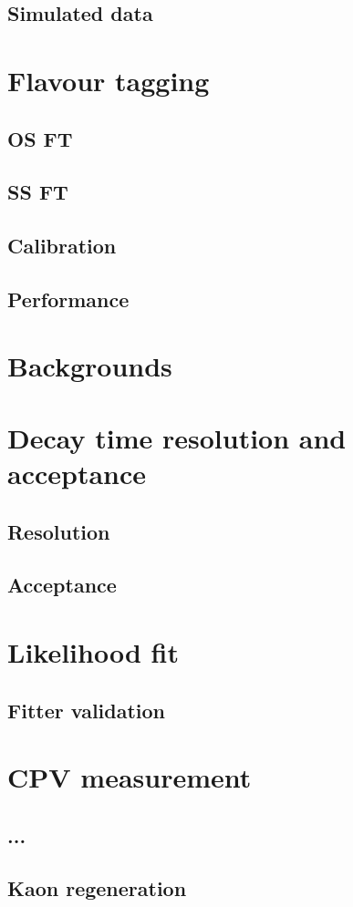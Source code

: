 \subsection{Simulated data}
\section{Flavour tagging}
\subsection{OS FT}
\subsection{SS FT}
\subsection{Calibration}
\subsection{Performance}
\section{Backgrounds}
\section{Decay time resolution and acceptance}
\subsection{Resolution}
\subsection{Acceptance}
\section{Likelihood fit}
\subsection{Fitter validation}
\section{CPV measurement}
\subsection{...}
\subsection{Kaon regeneration}
